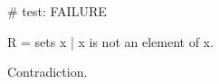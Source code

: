 # test: FAILURE

\begin{forthel}
  \begin{definition}
    R = { sets x | x is not an element of x}.
  \end{definition}

  \begin{theorem}
    Contradiction.
  \end{theorem}
\end{forthel}

